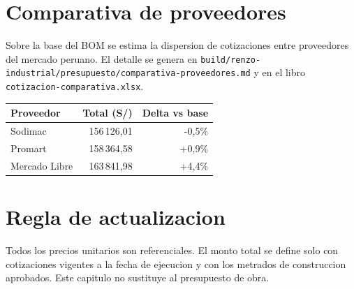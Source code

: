 \section{Comparativa de proveedores}
Sobre la base del BOM se estima la dispersion de cotizaciones entre
proveedores del mercado peruano. El detalle se genera en
\texttt{build/renzo-industrial/presupuesto/comparativa-proveedores.md} y en el
libro \texttt{cotizacion-comparativa.xlsx}.

\begin{center}
\small
\begin{tabularx}{\linewidth}{@{}l r r@{}}
\toprule
Proveedor & Total (S/) & Delta vs base \\
\midrule
Sodimac & 156\,126,01 & -0,5\% \\
Promart & 158\,364,58 & +0,9\% \\
Mercado Libre & 163\,841,98 & +4,4\% \\
\bottomrule
\end{tabularx}
\end{center}

\section{Regla de actualizacion}
Todos los precios unitarios son referenciales. El monto total se define solo
con cotizaciones vigentes a la fecha de ejecucion y con los metrados de
construccion aprobados. Este capitulo no sustituye al presupuesto de obra.
